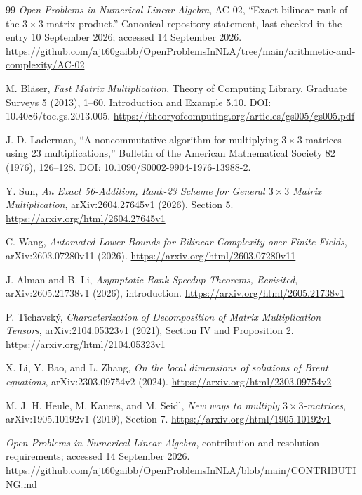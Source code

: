 \documentclass[11pt,letterpaper]{article}
\theoremstyle{definition}\newtheorem{definition}[theorem]{Definition}
\theoremstyle{remark}\newtheorem{remark}[theorem]{Remark}
\begin{document}
\begin{thebibliography}{99}
\emph{Open Problems in Numerical Linear Algebra}, AC-02,
``Exact bilinear rank of the $3\times3$ matrix product.'' Canonical
repository statement, last checked in the entry 10 September 2026;
accessed 14 September 2026.
\url{https://github.com/ajt60gaibb/OpenProblemsInNLA/tree/main/arithmetic-and-complexity/AC-02}

M. Bl\"aser, \emph{Fast Matrix Multiplication}, Theory of Computing Library,
Graduate Surveys 5 (2013), 1--60. Introduction and Example 5.10.
DOI: 10.4086/toc.gs.2013.005.
\url{https://theoryofcomputing.org/articles/gs005/gs005.pdf}

J. D. Laderman, ``A noncommutative algorithm for multiplying $3\times3$
matrices using 23 multiplications,'' Bulletin of the American Mathematical
Society 82 (1976), 126--128.
DOI: 10.1090/S0002-9904-1976-13988-2.

Y. Sun, \emph{An Exact 56-Addition, Rank-23 Scheme for General $3\times3$
Matrix Multiplication}, arXiv:2604.27645v1 (2026), Section 5.
\url{https://arxiv.org/html/2604.27645v1}

C. Wang, \emph{Automated Lower Bounds for Bilinear Complexity over Finite
Fields}, arXiv:2603.07280v11 (2026).
\url{https://arxiv.org/html/2603.07280v11}

J. Alman and B. Li, \emph{Asymptotic Rank Speedup Theorems, Revisited},
arXiv:2605.21738v1 (2026), introduction.
\url{https://arxiv.org/html/2605.21738v1}

P. Tichavsk\'y, \emph{Characterization of Decomposition of Matrix
Multiplication Tensors}, arXiv:2104.05323v1 (2021), Section IV and
Proposition 2.
\url{https://arxiv.org/html/2104.05323v1}

X. Li, Y. Bao, and L. Zhang, \emph{On the local dimensions of solutions
of Brent equations}, arXiv:2303.09754v2 (2024).
\url{https://arxiv.org/html/2303.09754v2}

M. J. H. Heule, M. Kauers, and M. Seidl, \emph{New ways to multiply
$3\times3$-matrices}, arXiv:1905.10192v1 (2019), Section 7.
\url{https://arxiv.org/html/1905.10192v1}

\emph{Open Problems in Numerical Linear Algebra}, contribution and
resolution requirements; accessed 14 September 2026.
\url{https://github.com/ajt60gaibb/OpenProblemsInNLA/blob/main/CONTRIBUTING.md}
\end{thebibliography}
\end{document}
